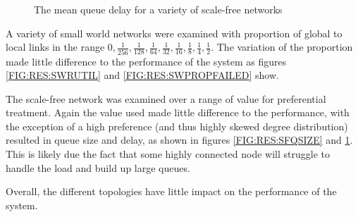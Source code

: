 \begin{figure}[h] 
  \centering
  \caption{The mean queue delay for a variety of scale-free networks}
  \label{FIG:RES:SFQDELAY}
\end{figure}


A variety of small world networks were examined with proportion of global to
local links in the range  $0, \frac{1}{256}, \frac{1}{128}, \frac{1}{64},
\frac{1}{32}, \frac{1}{16}, \frac{1}{8}, \frac{1}{4}, \frac{1}{2}$. The
variation of the proportion made little difference to the performance of the
system as figures \ref{FIG:RES:SWRUTIL} and \ref{FIG:RES:SWPROPFAILED} show.

The scale-free network was examined over a range of value for preferential
treatment. Again the value used made little difference to the performance, with
the exception of a high preference (and thus highly skewed degree distribution)
resulted in queue size and delay, as shown in figures \ref{FIG:RES:SFQSIZE} and
\ref{FIG:RES:SFQDELAY}.  This is likely due the fact that some highly connected
node will struggle to handle the load and build up large queues.

Overall, the different topologies have little impact on the performance of the
system.


